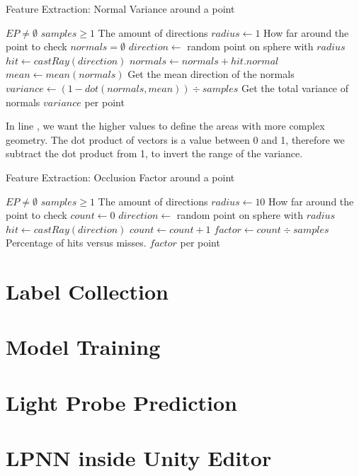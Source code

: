 \begin{algorithm}
	\caption{Feature Extraction: Normal Variance around a point}
	\label{alg:feat_nv}
	\begin{algorithmic}[1]
		\Require $EP \neq \emptyset$
		\Require $samples \geq 1$ \Comment The amount of directions
		\State $radius \gets 1$ \Comment How far around the point to check
			\State $normals = \emptyset$
				\State $direction \gets$ random point on sphere with $radius$
				\State $hit \gets castRay(direction)$
					\State $normals \gets normals + hit.normal$
				\EndIf
			\EndFor
			\State $mean \gets mean(normals)$ \Comment Get the mean direction of the normals
			\State $variance \gets (1- dot(normals, mean)) \div samples$
			\label{alg:feat_nv:12}
			\Comment Get the total variance of normals
		\EndFor
		\State \Return $variance$ per point
	\end{algorithmic}
\end{algorithm}

In line , we want the higher values to define the areas with more complex geometry. The dot product of vectors is a value between 0 and 1, therefore we subtract the dot product from 1, to invert the range of the variance.

\begin{algorithm}
	\caption{Feature Extraction: Occlusion Factor around a point}
	\label{alg:feat_of}
	\begin{algorithmic}[1]
		\Require $EP \neq \emptyset$
		\Require $samples \geq 1$ \Comment The amount of directions
		\State $radius \gets 10$ \Comment How far around the point to check
			\State $count \gets 0$
				\State $direction \gets$ random point on sphere with $radius$
				\State $hit \gets castRay(direction)$
					\State $count \gets count + 1$
				\EndIf
			\EndFor
			\State $factor \gets count \div samples$
			\Comment Percentage of hits versus misses.
		\EndFor
		\State \Return $factor$ per point
	\end{algorithmic}
\end{algorithm}

\section{Label Collection}

\section{Model Training}

\section{Light Probe Prediction}

\section{LPNN inside Unity Editor}
